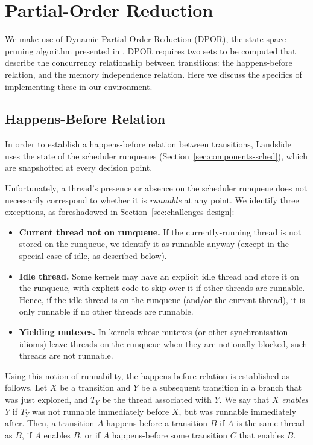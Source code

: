 \section{Partial-Order Reduction}
\label{sec:techniques-por}

We make use of Dynamic Partial-Order Reduction (DPOR), the state-space pruning algorithm presented in \cite{dpor}. DPOR requires two sets to be computed that describe the concurrency relationship between transitions: the happens-before relation, and the memory independence relation. Here we discuss the specifics of implementing these in our environment.

\subsection{Happens-Before Relation}

In order to establish a happens-before relation between transitions, Landslide uses the state of the scheduler runqueues (Section~\ref{sec:components-sched}), which are snapshotted at every decision point.

Unfortunately, a thread's presence or absence on the scheduler runqueue does not necessarily correspond to whether it is {\em runnable} at any point. We identify three exceptions, as foreshadowed in Section~\ref{sec:challenges-design}:

\begin{itemize}
	\item {\bf Current thread not on runqueue.} If the currently-running thread is not stored on the runqueue, we identify it as runnable anyway (except in the special case of idle, as described below).
	\item {\bf Idle thread.} Some kernels may have an explicit idle thread and store it on the runqueue, with explicit code to skip over it if other threads are runnable. Hence, if the idle thread is on the runqueue (and/or the current thread), it is only runnable if no other threads are runnable.
	\item {\bf Yielding mutexes.} In kernels whose mutexes (or other synchronisation idioms) leave threads on the runqueue when they are notionally blocked, such threads are not runnable.
\end{itemize}

Using this notion of runnability, the happens-before relation is established as follows. Let $X$ be a transition and $Y$ be a subsequent transition in a branch that was just explored, and $T_Y$ be the thread associated with $Y$. We say that $X$ {\em enables} $Y$ if $T_Y$ was not runnable immediately before $X$, but was runnable immediately after. Then, a transition $A$ happens-before a transition $B$ if $A$ is the same thread as $B$, if $A$ enables $B$, or if $A$ happens-before some transition $C$ that enables $B$.

